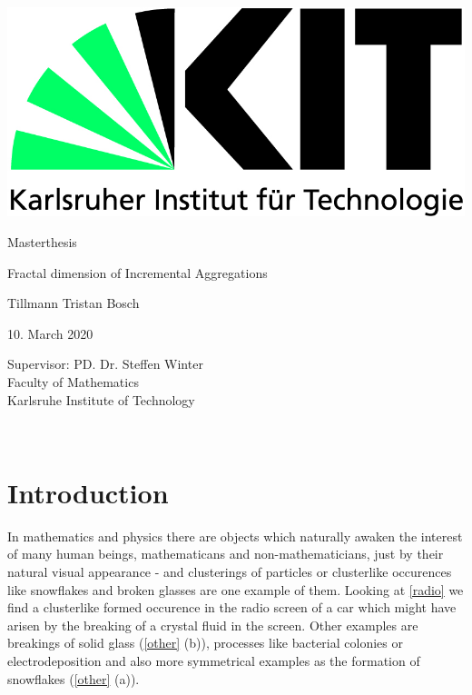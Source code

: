 \documentclass[12pt,a4paper]{scrartcl}
\numberwithin{equation}{subsection}
\newcommand{\1}{\mathbbm{1}}
\numberwithin{equation}{section}
\theoremstyle{definition}
\begin{document}
	\pagestyle{empty}

\begin{titlepage}

	\includegraphics[scale=0.45]{images/kit-logo.jpg} 
    \vspace*{2cm} 
\begin{center} \large 
    
   Masterthesis
    \vspace*{2cm}

    {\huge Fractal dimension of Incremental Aggregations}\\
    \vspace*{2.5cm}

    Tillmann Tristan Bosch
    \vspace*{1.5cm}

    10. March 2020
    \vspace*{3.5cm}


    Supervisor: PD. Dr. Steffen Winter \\[1cm]
    Faculty of Mathematics\\[1cm]
	Karlsruhe Institute of Technology
\end{center}
\end{titlepage}

\newpage

\newpage
\phantom \\
\newpage

\tableofcontents %

 	\pagestyle{headings}

\setcounter{page}{1}


\newpage

\section{Introduction}
	In mathematics and physics there are objects which naturally awaken the interest of many human beings, mathematicans and non-mathematicians, just by their natural visual appearance - and clusterings of particles or clusterlike occurences like snowflakes and broken glasses are one example of them. Looking at \autoref{radio} we find a clusterlike formed occurence in the radio screen of a car which might have arisen by the breaking of a crystal fluid in the screen. Other examples are breakings of solid glass (\autoref{other} (b)), processes like bacterial colonies or electrodeposition and also more symmetrical examples as the formation of snowflakes (\autoref{other} (a)). \\
	
\end{document}
